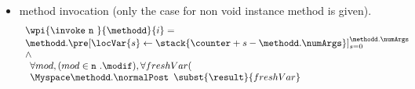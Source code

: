 \begin{itemize}
\begin{enumerate}
	\end{enumerate}
	 				 	\item method invocation  (only the case for non void instance method is given). 
	 				 			$$\begin{array}{l}
								 \wpi{\invoke  \   \mbox{\rm\texttt{n} } } {\methodd}{i}  =   \\
	 				 		 \methodd.\pre[ \locVar{s} \leftarrow \stack{\counter + s -\methodd.\numArgs}]_{s = 0}^{\methodd.\numArgs }  \\
	 				 			\wedge \\
								\begin{array}{l}
	 				 			       \forall  mod ,  ( mod \in \mbox{\rm\texttt{n} } .\modif ), \forall freshVar (  \\ 
	 				 				              \Myspace \methodd.\normalPost \begin{array}{l}
									               \subst{\result}{  freshVar } \\

\end{array}
\end{array}
\end{array}$$
\end{itemize}
